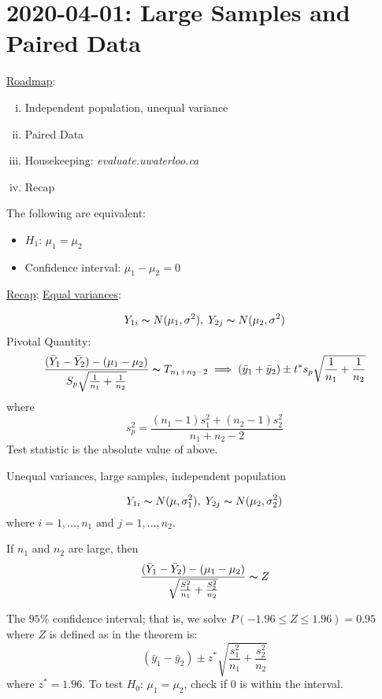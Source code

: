 \section{2020-04-01: Large Samples and Paired Data}
\underline{Roadmap}:
\begin{enumerate}[(i)]
    \item Independent population, unequal variance
    \item Paired Data
    \item Housekeeping: \emph{evaluate.uwaterloo.ca}
    \item Recap
\end{enumerate}

The following are equivalent:
\begin{itemize}
    \item $ H_1 $: $ \mu_1=\mu_2 $
    \item Confidence interval: $ \mu_1-\mu_2=0 $
\end{itemize}

\underline{Recap}: \underline{Equal variances}:

\[ Y_{1i} \thicksim N(\mu_1,\sigma^2),\; Y_{2j} \thicksim N(\mu_2,\sigma^2) \]
Pivotal Quantity:
\[ \frac{(\bar{Y}_1-\bar{Y}_2)-(\mu_1-\mu_2)}{S_p \sqrt{\frac{1}{n_1}+\frac{1}{n_2}}}
    \thicksim T_{n_1+n_2-2}\implies (\bar{y}_1+\bar{y}_2)\pm t^* s_p\sqrt{\frac{1}{n_1}+\frac{1}{n_2}}  \]
where
\[ s_p^2=\frac{(n_1-1)s_1^2+(n_2-1)s_2^2}{n_1+n_2-2}  \]
Test statistic is the absolute value of above.

Unequal variances, large samples, independent population

\[ Y_{1i}\thicksim N(\mu,\sigma_1^2),\; Y_{2j} \thicksim N(\mu_2,\sigma_2^2) \]
where $ i=1,\ldots ,n_1 $ and $ j=1,\ldots ,n_2 $.
\begin{thmbox}
    \begin{theorem}
        If $ n_1 $ and $ n_2 $ are large, then
        \[ \frac{(\bar{Y}_1-\bar{Y}_2)-(\mu_1-\mu_2)}{\sqrt{\frac{S_1^2}{n_1}+\frac{S_2^2}{n_2}}}
            \thicksim Z  \]
    \end{theorem}
\end{thmbox}
The $ 95\% $ confidence interval; that is, we solve $ P(-1.96\leqslant Z \leqslant 1.96)=0.95 $
where $ Z $ is defined as in the theorem is:
\[ (\bar{y}_1-\bar{y}_2)\pm z^*\sqrt{\frac{s_1^2}{n_1}+\frac{s_2^2}{n_2}} \]
where $ z^*=1.96 $. To test $ H_0 $: $ \mu_1=\mu_2 $, check if $ 0 $ is within the interval.


